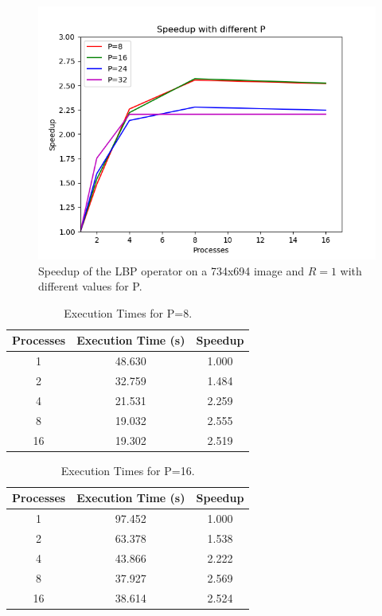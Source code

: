 \documentclass[10pt,twocolumn,letterpaper]{article}
\begin{document}
\begin{figure}[H]
	\includegraphics[width=\linewidth]{images/speedup_by_p.png}
	\caption{Speedup of the LBP operator on a 734x694 image and $R = 1$ with different values for P.}
	\label{fig:speedup_p}
\end{figure}

\begin{table}[H]
	\begin{center}
		\begin{tabular}{|c|c|c|}
			\hline
			Processes & Execution Time (s) & Speedup \\
			\hline
			1 & 48.630 & 1.000 \\
			2 & 32.759 & 1.484 \\
			4 & 21.531 & 2.259 \\
			8 & 19.032 & 2.555 \\
			16 & 19.302 & 2.519 \\
			\hline
		\end{tabular}
	\end{center}
	\caption{Execution Times for P=8.}
	\label{tab:speedup_p_1}
\end{table}

\begin{table}[H]
	\begin{center}
		\begin{tabular}{|c|c|c|}
			\hline
			Processes & Execution Time (s) & Speedup \\
			\hline
			1 & 97.452 & 1.000 \\
			2 & 63.378 & 1.538 \\
			4 & 43.866 & 2.222 \\
			8 & 37.927 & 2.569 \\
			16 & 38.614 & 2.524 \\
			\hline
		\end{tabular}
	\end{center}
	\caption{Execution Times for P=16.}
	\label{tab:speedup_p_2}
\end{table}
\end{document}

